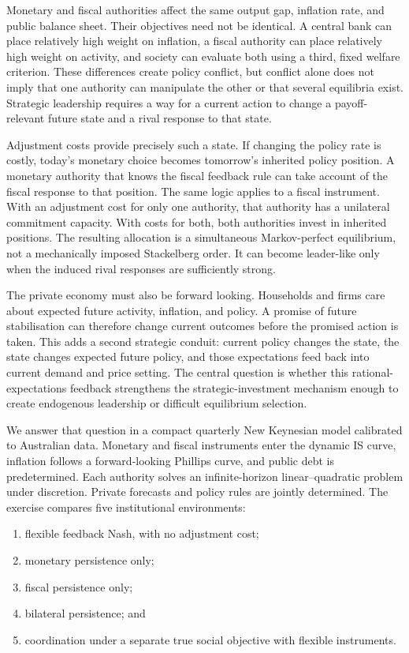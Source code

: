 \documentclass[11pt]{article}
\begin{document}
Monetary and fiscal authorities affect the same output gap, inflation rate,
and public balance sheet. Their objectives need not be identical. A central
bank can place relatively high weight on inflation, a fiscal authority can
place relatively high weight on activity, and society can evaluate both using
a third, fixed welfare criterion. These differences create policy conflict,
but conflict alone does not imply that one authority can manipulate the other
or that several equilibria exist. Strategic leadership requires a way for a
current action to change a payoff-relevant future state and a rival response to
that state.

Adjustment costs provide precisely such a state. If changing the policy rate
is costly, today's monetary choice becomes tomorrow's inherited policy
position. A monetary authority that knows the fiscal feedback rule can take
account of the fiscal response to that position. The same logic applies to a
fiscal instrument. With an adjustment cost for only one authority, that
authority has a unilateral commitment capacity. With costs for both, both
authorities invest in inherited positions. The resulting allocation is a
simultaneous Markov-perfect equilibrium, not a mechanically imposed
Stackelberg order. It can become leader-like only when the induced rival
responses are sufficiently strong.

The private economy must also be forward looking. Households and firms care
about expected future activity, inflation, and policy. A promise of future
stabilisation can therefore change current outcomes before the promised action
is taken. This adds a second strategic conduit: current policy changes the
state, the state changes expected future policy, and those expectations feed
back into current demand and price setting. The central question is whether
this rational-expectations feedback strengthens the strategic-investment
mechanism enough to create endogenous leadership or difficult equilibrium
selection.

We answer that question in a compact quarterly New Keynesian model calibrated
to Australian data. Monetary and fiscal instruments enter the dynamic IS
curve, inflation follows a forward-looking Phillips curve, and public debt is
predetermined. Each authority solves an infinite-horizon linear--quadratic
problem under discretion. Private forecasts and policy rules are jointly
determined. The exercise compares five institutional environments:

\begin{enumerate}
  \item flexible feedback Nash, with no adjustment cost;
  \item monetary persistence only;
  \item fiscal persistence only;
  \item bilateral persistence; and
  \item coordination under a separate true social objective with flexible
        instruments.
\end{enumerate}
\end{document}

